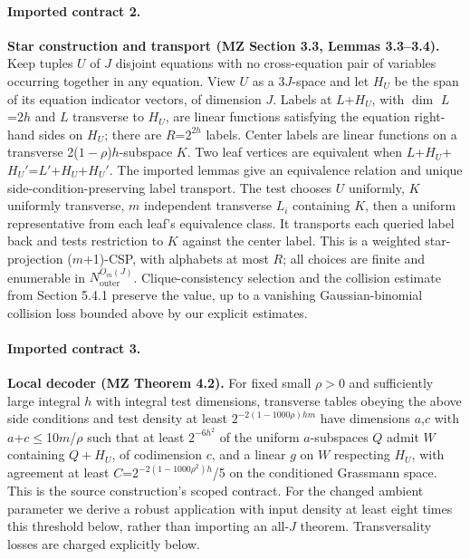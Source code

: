 \paragraph{Imported contract 2.} \textbf{Star construction and transport (MZ Section 3.3, Lemmas 3.3--3.4).} Keep tuples \(U\) of \(J\) disjoint equations with no cross-equation pair of variables occurring together in any equation. View \(U\) as a 3\(J\)-space and let \(H_U\) be the span of its equation indicator vectors, of dimension \(J\). Labels at \(L\)+\(H_U\), with \(\dim\) \(L\)=2\(h\) and \(L\) transverse to \(H_U\), are linear functions satisfying the equation right-hand sides on \(H_U\); there are \(R\)=\(2^{2h}\) labels. Center labels are linear functions on a transverse 2(\(1-\rho\))\(h\)-subspace \(K\). Two leaf vertices are equivalent when \(L\)+\(H_U\)+\(H_U'\)=\(L'\)+\(H_U\)+\(H_U'\). The imported lemmas give an equivalence relation and unique side-condition-preserving label transport. The test chooses \(U\) uniformly, \(K\) uniformly transverse, \(m\) independent transverse \(L_i\) containing \(K\), then a uniform representative from each leaf's equivalence class. It transports each queried label back and tests restriction to \(K\) against the center label. This is a weighted star-projection (\(m\)+1)-CSP, with alphabets at most \(R\); all choices are finite and enumerable in \(N_{\mathrm{outer}}^{O_m(J)}\). Clique-consistency selection and the collision estimate from Section 5.4.1 preserve the value, up to a vanishing Gaussian-binomial collision loss bounded above by our explicit estimates.

\paragraph{Imported contract 3.} \textbf{Local decoder (MZ Theorem 4.2).} For fixed small \(\rho\)\(>\)0 and sufficiently large integral \(h\) with integral test dimensions, transverse tables obeying the above side conditions and test density at least \(2^{-2(1-1000\rho)hm}\) have dimensions \(a\),\(c\) with \(a\)+\(c\)\(\le\)10\(m\)/\(\rho\) such that at least \(2^{-6h^2}\) of the uniform \(a\)-subspaces \(Q\) admit \(W\) containing \(Q+H_U\), of codimension \(c\), and a linear \(g\) on \(W\) respecting \(H_U\), with agreement at least \(C\)=\(2^{-2(1-1000\rho^2)h}\)/5 on the conditioned Grassmann space. This is the source construction's scoped contract. For the changed ambient parameter we derive a robust application with input density at least eight times this threshold below, rather than importing an all-\(J\) theorem. Transversality losses are charged explicitly below.

